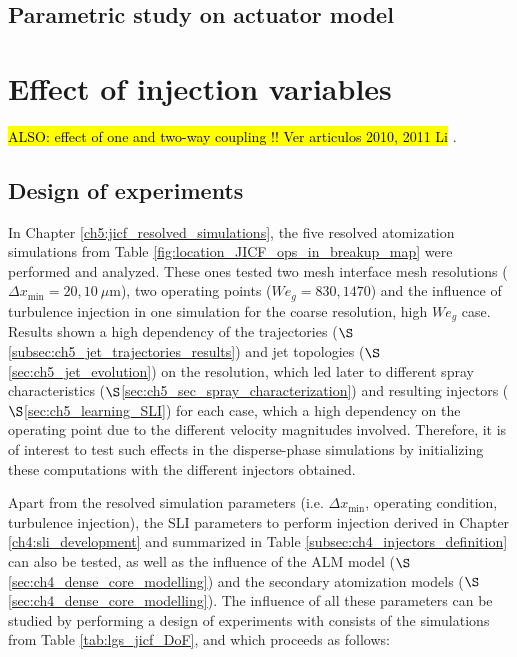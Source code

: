 \subsection{Parametric study on actuator model}


\clearpage

\section{Effect of injection variables}

\hl{ALSO: effect of one and two-way coupling !! Ver articulos 2010, 2011 Li }.

\subsection{Design of experiments}

In Chapter \ref{ch5:jicf_resolved_simulations}, the five resolved atomization simulations from Table \ref{fig:location_JICF_ops_in_breakup_map} were performed and analyzed. These ones tested two mesh interface mesh resolutions ($\Delta x_\mathrm{min} = 20, 10~\mu$m), two operating points ($We_g = 830, 1470$) and the influence of turbulence injection in one simulation for the coarse resolution, high $We_g$ case. Results shown a high dependency of the trajectories ($\S$\ref{subsec:ch5_jet_trajectories_results}) and jet topologies ($\S$\ref{sec:ch5_jet_evolution}) on the resolution, which led later to different spray characteristics ($\S$\ref{sec:ch5_sec_spray_characterization}) and resulting injectors ($\S$\ref{sec:ch5_learning_SLI}) for each case, which a high dependency on the operating point due to the different velocity magnitudes involved. Therefore, it is of interest to test such effects in the disperse-phase simulations by initializing these computations with the different injectors obtained.

Apart from the resolved simulation parameters (i.e. $\Delta x_\mathrm{min}$, operating condition, turbulence injection), the SLI parameters to perform injection derived in Chapter \ref{ch4:sli_development} and summarized in Table \ref{subsec:ch4_injectors_definition} can also be tested, as well as the influence of the ALM model ($\S$\ref{sec:ch4_dense_core_modelling}) and the secondary atomization models ($\S$\ref{sec:ch4_dense_core_modelling}). The influence of all these parameters can be studied by performing a design of experiments with consists of the simulations from Table \ref{tab:lgs_jicf_DoF}, and which proceeds as follows: 


